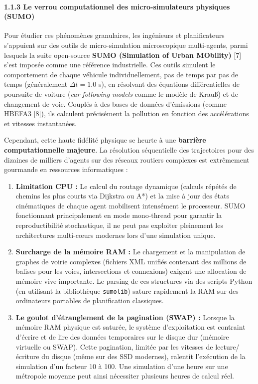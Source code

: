 \documentclass[10pt, a4paper]{article}
\providecommand{\tightlist}{}
\begin{document}
\paragraph{1.1.3 Le verrou computationnel des micro-simulateurs
physiques
(SUMO)}\label{le-verrou-computationnel-des-micro-simulateurs-physiques-sumo}

Pour étudier ces phénomènes granulaires, les ingénieurs et
planificateurs s'appuient sur des outils de micro-simulation
microscopique multi-agents, parmi lesquels la suite open-source
\textbf{SUMO (Simulation of Urban MObility)} {[}7{]} s'est imposée comme
une référence industrielle. Ces outils simulent le comportement de
chaque véhicule individuellement, pas de temps par pas de temps
(généralement \(\Delta t = 1.0\) s), en résolvant des équations
différentielles de poursuite de voiture (\emph{car-following models}
comme le modèle de Krauß) et de changement de voie. Couplés à des bases
de données d'émissions (comme HBEFA3 {[}8{]}), ils calculent précisément
la pollution en fonction des accélérations et vitesses instantanées.

Cependant, cette haute fidélité physique se heurte à une
\textbf{barrière computationnelle majeure}. La résolution séquentielle
des trajectoires pour des dizaines de milliers d'agents sur des réseaux
routiers complexes est extrêmement gourmande en ressources informatiques
:

\begin{enumerate}
\def\labelenumi{\arabic{enumi}.}
\tightlist
\item
  \textbf{Limitation CPU :} Le calcul du routage dynamique (calculs
  répétés de chemins les plus courts via Dijkstra ou A*) et la mise à
  jour des états cinématiques de chaque agent mobilisent intensément le
  processeur. SUMO fonctionnant principalement en mode mono-thread pour
  garantir la reproductibilité stochastique, il ne peut pas exploiter
  pleinement les architectures multi-cœurs modernes lors d'une
  simulation unique.
\item
  \textbf{Surcharge de la mémoire RAM :} Le chargement et la
  manipulation de graphes de voirie complexes (fichiers XML unifiés
  contenant des millions de balises pour les voies, intersections et
  connexions) exigent une allocation de mémoire vive importante. Le
  parsing de ces structures via des scripts Python (en utilisant la
  bibliothèque \texttt{sumolib}) sature rapidement la RAM sur des
  ordinateurs portables de planification classiques.
\item
  \textbf{Le goulot d'étranglement de la pagination (SWAP) :} Lorsque la
  mémoire RAM physique est saturée, le système d'exploitation est
  contraint d'écrire et de lire des données temporaires sur le disque
  dur (mémoire virtuelle ou SWAP). Cette pagination, limitée par les
  vitesses de lecture/écriture du disque (même sur des SSD modernes),
  ralentit l'exécution de la simulation d'un facteur 10 à 100. Une
  simulation d'une heure sur une métropole moyenne peut ainsi nécessiter
  plusieurs heures de calcul réel.
\end{enumerate}
\end{document}

